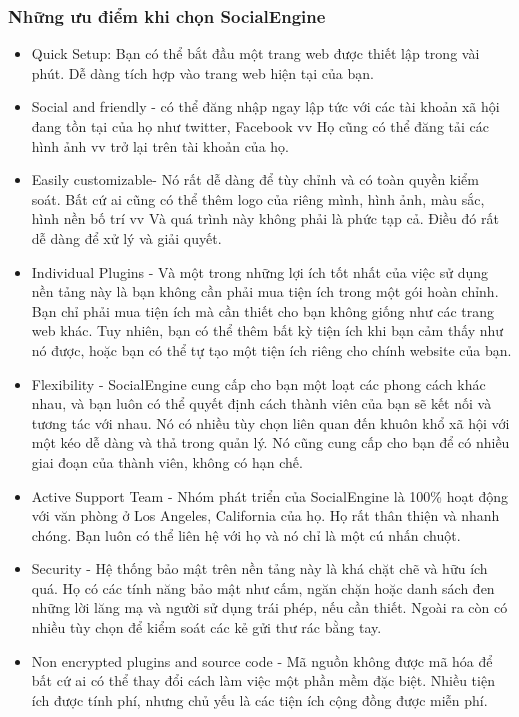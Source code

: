 \subsubsection{Những ưu điểm khi chọn SocialEngine}
\begin{itemize}
	\item Quick Setup: Bạn có thể bắt đầu một trang web được thiết lập trong vài phút. Dễ dàng tích hợp vào trang web hiện tại của bạn.
	\item Social and friendly - có thể đăng nhập ngay lập tức với các tài khoản xã hội đang tồn tại của họ như twitter, Facebook vv Họ cũng có thể đăng tải các hình ảnh vv trở lại trên tài khoản của họ.
	\item Easily customizable- Nó rất dễ dàng để tùy chỉnh và có toàn quyền kiểm soát. Bất cứ ai cũng có thể thêm logo của riêng mình, hình ảnh, màu sắc, hình nền bố trí vv Và quá trình này không phải là phức tạp cả. Điều đó rất dễ dàng để xử lý và giải quyết.
	\item Individual Plugins - Và một trong những lợi ích tốt nhất của việc sử dụng nền tảng này là bạn không cần phải mua tiện ích trong một gói hoàn chỉnh. Bạn chỉ phải mua tiện ích mà cần thiết cho bạn không giống như các trang web khác. Tuy nhiên, bạn có thể thêm bất kỳ tiện ích khi bạn cảm thấy như nó được, hoặc bạn có thể tự tạo một tiện ích riêng cho chính website của bạn.
	\item Flexibility - SocialEngine cung cấp cho bạn một loạt các phong cách khác nhau, và bạn luôn có thể quyết định cách thành viên của bạn sẽ kết nối và tương tác với nhau. Nó có nhiều tùy chọn liên quan đến khuôn khổ xã hội với một kéo dễ dàng và thả trong quản lý. Nó cũng cung cấp cho bạn để có nhiều giai đoạn của thành viên, không có hạn chế.
	\item Active Support Team - Nhóm phát triển của SocialEngine là 100\% hoạt động với văn phòng ở Los Angeles, California của họ. Họ rất thân thiện và nhanh chóng. Bạn luôn có thể liên hệ với họ và nó chỉ là một cú nhấn chuột.
	\item Security - Hệ thống bảo mật trên nền tảng này là khá chặt chẽ và hữu ích quá. Họ có các tính năng bảo mật như cấm, ngăn chặn hoặc danh sách đen những lời lăng mạ và người sử dụng trái phép, nếu cần thiết. Ngoài ra còn có nhiều tùy chọn để kiểm soát các kẻ gửi thư rác bằng tay.
	\item Non encrypted plugins and source code - Mã nguồn không được mã hóa để bất cứ ai có thể thay đổi cách làm việc một phần mềm đặc biệt. Nhiều tiện ích được tính phí, nhưng chủ yếu là các tiện ích cộng đồng được miễn phí.

\end{itemize}
